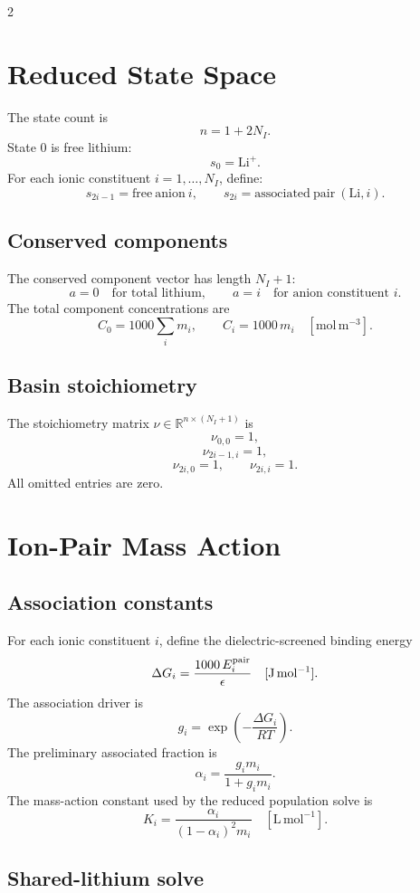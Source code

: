 \documentclass[10pt]{article}
\newcommand{\R}{\mathbb{R}}
\newcommand{\molm}{\mathrm{mol\,m^{-3}}}
\begin{document}
\begin{multicols}{2}
\section{Reduced State Space}

The state count is
\[
n = 1+2N_I.
\]
State \(0\) is free lithium:
\[
s_0=\mathrm{Li^+}.
\]
For each ionic constituent \(i=1,\ldots,N_I\), define:
\[
s_{2i-1}=\mathrm{free\ anion\ }i,
\qquad
s_{2i}=\mathrm{associated\ pair\ }(\mathrm{Li},i).
\]
\subsection{Conserved components}

The conserved component vector has length \(N_I+1\):
\[
a=0\quad\text{for total lithium},
\qquad
a=i\quad\text{for anion constituent }i.
\]
The total component concentrations are
\[
C_0=1000\sum_i m_i,
\qquad
C_i=1000\,m_i
\quad [\molm].
\]

\subsection{Basin stoichiometry}

The stoichiometry matrix \(\nu\in\R^{n\times(N_I+1)}\) is
\[
\nu_{0,0}=1,
\]
\[
\nu_{2i-1,i}=1,
\]
\[
\nu_{2i,0}=1,
\qquad
\nu_{2i,i}=1.
\]
All omitted entries are zero.

\section{Ion-Pair Mass Action}

\subsection{Association constants}

For each ionic constituent \(i\), define the dielectric-screened binding energy
\[
\Delta G_i
=
\frac{1000\,E^{\rm pair}_i}{\epsilon}
\quad [\mathrm{J\,mol^{-1}}].
\]
The association driver is
\[
g_i = \exp\!\left(-\frac{\Delta G_i}{RT}\right).
\]
The preliminary associated fraction is
\[
\alpha_i
=
\frac{g_i m_i}{1+g_i m_i}.
\]
The mass-action constant used by the reduced population solve is
\[
K_i
=
\frac{\alpha_i}{(1-\alpha_i)^2m_i}
\quad [\mathrm{L\,mol^{-1}}].
\]

\subsection{Shared-lithium solve}


\end{multicols}
\end{document}
